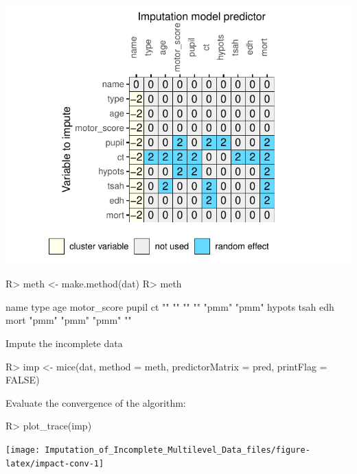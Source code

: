 \documentclass[
]{jss}
\begin{document}
\begin{CodeChunk}
\begin{center}\includegraphics{Imputation_of_Incomplete_Multilevel_Data_files/figure-latex/impact-2} \end{center}

\begin{CodeInput}
R> meth <- make.method(dat)
R> meth
\end{CodeInput}
\begin{CodeOutput}
       name        type         age motor_score       pupil          ct 
         ""          ""          ""          ""       "pmm"       "pmm" 
     hypots        tsah         edh        mort 
      "pmm"       "pmm"       "pmm"          "" 
\end{CodeOutput}
\end{CodeChunk}

Impute the incomplete data

\begin{CodeChunk}
\begin{CodeInput}
R> imp <- mice(dat, method = meth, predictorMatrix = pred, printFlag = FALSE)
\end{CodeInput}
\end{CodeChunk}

Evaluate the convergence of the algorithm:

\begin{CodeChunk}
\begin{CodeInput}
R> plot_trace(imp)
\end{CodeInput}


\begin{center}\texttt{[image: Imputation\_of\_Incomplete\_Multilevel\_Data\_files/figure-latex/impact-conv-1]} \end{center}

\end{CodeChunk}
\end{document}
